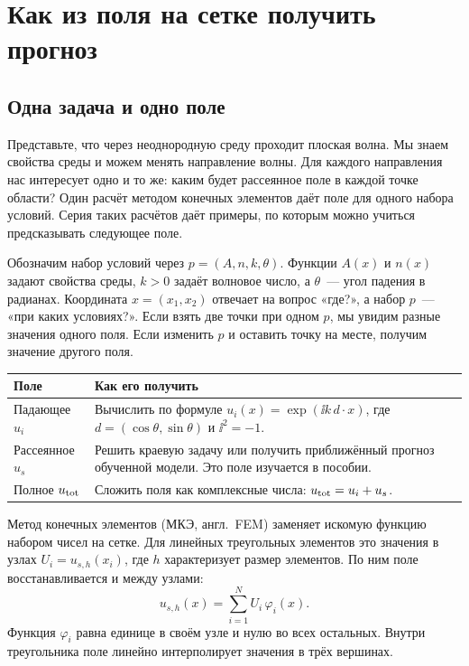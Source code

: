 \chapter{Как из поля на сетке получить прогноз}
\label{primer:chapter}

\section{Одна задача и одно поле}
\label{primer:physical}
Представьте, что через неоднородную среду проходит плоская волна.
Мы знаем свойства среды и можем менять направление волны.
Для каждого направления нас интересует одно и то же: каким будет
рассеянное поле в каждой точке области? Один расчёт методом конечных
элементов даёт поле для одного набора условий. Серия таких расчётов
даёт примеры, по которым можно учиться предсказывать следующее поле.

Обозначим набор условий через $p=(A,n,k,\theta)$. Функции $A(x)$ и $n(x)$
задают свойства среды, $k>0$ задаёт волновое число, а $\theta$~--- угол
падения в радианах. Координата $x=(x_1,x_2)$ отвечает на вопрос «где?»,
а набор $p$~--- «при каких условиях?». Если взять две точки при одном $p$,
мы увидим разные значения одного поля. Если изменить $p$ и оставить точку
на месте, получим значение другого поля.

\begin{center}
\begin{tabularx}{\linewidth}{@{}l X@{}}
\toprule
Поле & Как его получить \\ \midrule
Падающее $u_i$ & Вычислить по формуле $u_i(x)=\exp(\ii k\,d\cdot x)$,
где $d=(\cos\theta,\sin\theta)$ и $\ii^2=-1$.\\[2pt]
Рассеянное $u_s$ & Решить краевую задачу или получить приближённый
прогноз обученной модели. Это поле изучается в пособии.\\[2pt]
Полное $u_{\rm tot}$ & Сложить поля как комплексные числа:
$u_{\rm tot}=u_i+u_s$.\\
\bottomrule
\end{tabularx}
\end{center}

Метод конечных элементов (МКЭ, англ.\ FEM) заменяет искомую
функцию набором чисел на сетке. Для линейных треугольных элементов
это значения в узлах $U_i=u_{s,h}(x_i)$, где $h$ характеризует размер
элементов. По ним поле восстанавливается и между узлами:
\[
  u_{s,h}(x)=\sum_{i=1}^{N} U_i\,\varphi_i(x).
\]
Функция $\varphi_i$ равна единице в своём узле и нулю во всех остальных.
Внутри треугольника поле линейно интерполирует значения в трёх вершинах.


